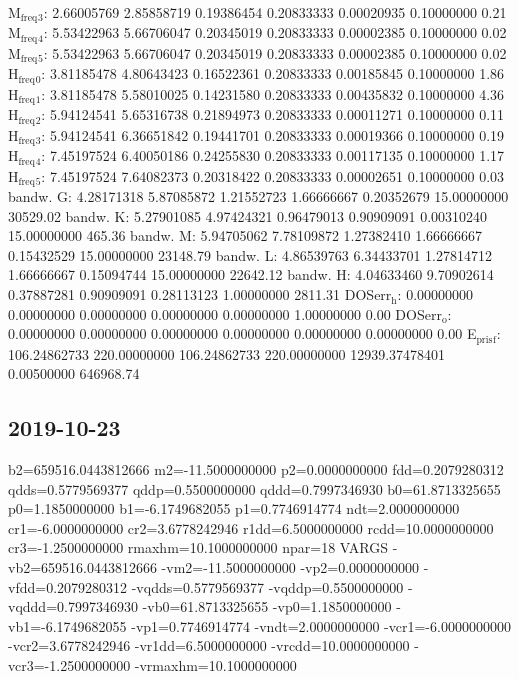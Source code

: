 \documentclass[11pt]{article}
\begin{document}
M\(_{\text{freq}}\)\(_{\text{3}}\):   2.66005769   2.85858719   0.19386454   0.20833333   0.00020935   0.10000000         0.21
M\(_{\text{freq}}\)\(_{\text{4}}\):   5.53422963   5.66706047   0.20345019   0.20833333   0.00002385   0.10000000         0.02
M\(_{\text{freq}}\)\(_{\text{5}}\):   5.53422963   5.66706047   0.20345019   0.20833333   0.00002385   0.10000000         0.02
H\(_{\text{freq}}\)\(_{\text{0}}\):   3.81185478   4.80643423   0.16522361   0.20833333   0.00185845   0.10000000         1.86
H\(_{\text{freq}}\)\(_{\text{1}}\):   3.81185478   5.58010025   0.14231580   0.20833333   0.00435832   0.10000000         4.36
H\(_{\text{freq}}\)\(_{\text{2}}\):   5.94124541   5.65316738   0.21894973   0.20833333   0.00011271   0.10000000         0.11
H\(_{\text{freq}}\)\(_{\text{3}}\):   5.94124541   6.36651842   0.19441701   0.20833333   0.00019366   0.10000000         0.19
H\(_{\text{freq}}\)\(_{\text{4}}\):   7.45197524   6.40050186   0.24255830   0.20833333   0.00117135   0.10000000         1.17
H\(_{\text{freq}}\)\(_{\text{5}}\):   7.45197524   7.64082373   0.20318422   0.20833333   0.00002651   0.10000000         0.03
bandw. G:   4.28171318   5.87085872   1.21552723   1.66666667   0.20352679  15.00000000     30529.02
bandw. K:   5.27901085   4.97424321   0.96479013   0.90909091   0.00310240  15.00000000       465.36
bandw. M:   5.94705062   7.78109872   1.27382410   1.66666667   0.15432529  15.00000000     23148.79
bandw. L:   4.86539763   6.34433701   1.27814712   1.66666667   0.15094744  15.00000000     22642.12
bandw. H:   4.04633460   9.70902614   0.37887281   0.90909091   0.28113123   1.00000000      2811.31
DOSerr\(_{\text{h}}\):   0.00000000   0.00000000   0.00000000   0.00000000   0.00000000   1.00000000         0.00
DOSerr\(_{\text{o}}\):   0.00000000   0.00000000   0.00000000   0.00000000   0.00000000   0.00000000         0.00
E\(_{\text{pris}}\)\(_{\text{f}}\): 106.24862733 220.00000000 106.24862733 220.00000000 12939.37478401   0.00500000    646968.74


\subsection{2019-10-23}
\label{sec:orgab69c8f}
  b2=659516.0443812666 m2=-11.5000000000 p2=0.0000000000 fdd=0.2079280312 qdds=0.5779569377 qddp=0.5500000000 qddd=0.7997346930 b0=61.8713325655 p0=1.1850000000 b1=-6.1749682055 p1=0.7746914774 ndt=2.0000000000 cr1=-6.0000000000 cr2=3.6778242946 r1dd=6.5000000000 rcdd=10.0000000000 cr3=-1.2500000000 rmaxhm=10.1000000000 npar=18 
VARGS
    -vb2=659516.0443812666 -vm2=-11.5000000000 -vp2=0.0000000000 -vfdd=0.2079280312 -vqdds=0.5779569377 -vqddp=0.5500000000 -vqddd=0.7997346930 -vb0=61.8713325655 -vp0=1.1850000000 -vb1=-6.1749682055 -vp1=0.7746914774 -vndt=2.0000000000 -vcr1=-6.0000000000 -vcr2=3.6778242946 -vr1dd=6.5000000000 -vrcdd=10.0000000000 -vcr3=-1.2500000000 -vrmaxhm=10.1000000000 
\end{document}
